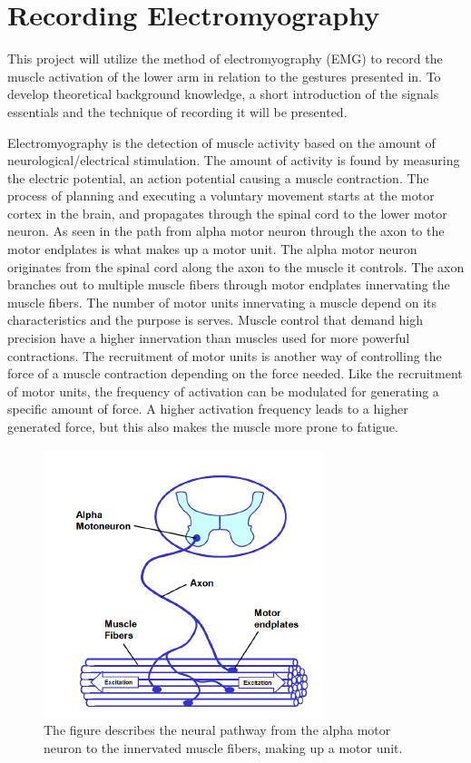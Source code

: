 

\section{Recording Electromyography}

This project will utilize the method of electromyography (EMG) to record the muscle activation of the lower arm in relation to the gestures presented in. To develop theoretical background knowledge, a short introduction of the signals essentials and the technique of recording it will be presented. 


Electromyography is the detection of muscle activity based on the amount of neurological/electrical stimulation. The amount of activity is found by measuring the electric potential, an action potential causing a muscle contraction. The process of planning and executing a voluntary movement starts at the motor cortex in the brain, and propagates through the spinal cord to the lower motor neuron. As seen in  the path from alpha motor neuron through the axon to the motor endplates is what makes up a motor unit. The alpha motor neuron originates from the spinal cord along the axon to the muscle it controls. The axon branches out to multiple muscle fibers through motor endplates innervating the muscle fibers. The number of motor units innervating a muscle depend on its characteristics and the purpose is serves. Muscle control that demand high precision have a higher innervation than muscles used for more powerful contractions. The recruitment of motor units is another way of controlling the force of a muscle contraction depending on the force needed. Like the recruitment of motor units, the frequency of activation can be modulated for generating a specific amount of force. A higher activation frequency leads to a higher generated force, but this also makes the muscle more prone to fatigue.\cite{Cram2012,Martini2012}       

\begin{figure}[H]                                         
	\includegraphics[width=.4\textwidth]{figures/motor_unit}  
	\caption{The figure describes the neural pathway from the alpha motor neuron to the innervated muscle fibers, making up a motor unit.\cite{Konrad2005}}
	\label{fig:motor} 
\end{figure}  

